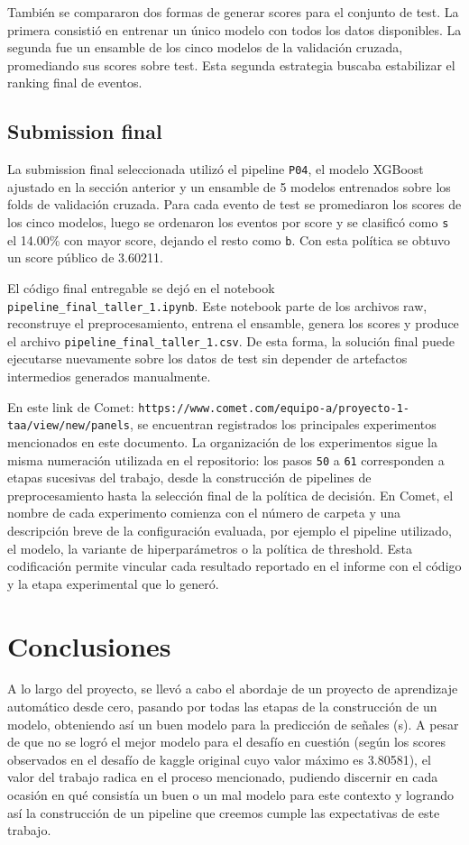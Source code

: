 \documentclass{article}
\begin{document}
También se compararon dos formas de generar scores para el conjunto de test. La primera consistió en entrenar un único modelo con todos los datos disponibles. La segunda fue un ensamble de los cinco modelos de la validación cruzada, promediando sus scores sobre test. Esta segunda estrategia buscaba estabilizar el ranking final de eventos.



\subsection{Submission final}
La submission final seleccionada utilizó el pipeline \texttt{P04}, el modelo XGBoost ajustado en la sección anterior y un ensamble de 5 modelos entrenados sobre los folds de validación cruzada. Para cada evento de test se promediaron los scores de los cinco modelos, luego se ordenaron los eventos por score y se clasificó como \texttt{s} el 14.00\% con mayor score, dejando el resto como \texttt{b}. Con esta política se obtuvo un score público de 3.60211. 

El código final entregable se dejó en el notebook \texttt{pipeline\_final\_taller\_1.ipynb}. Este notebook parte de los archivos raw, reconstruye el preprocesamiento, entrena el ensamble, genera los scores y produce el archivo \texttt{pipeline\_final\_taller\_1.csv}. De esta forma, la solución final puede ejecutarse nuevamente sobre los datos de test sin depender de artefactos intermedios generados manualmente.

En este link de Comet: \texttt{https://www.comet.com/equipo-a/proyecto-1-taa/view/new/panels}, se encuentran registrados los principales experimentos mencionados en este documento. La organización de los experimentos sigue la misma numeración utilizada en el repositorio: los pasos \texttt{50} a \texttt{61} corresponden a etapas sucesivas del trabajo, desde la construcción de pipelines de preprocesamiento hasta la selección final de la política de decisión. En Comet, el nombre de cada experimento comienza con el número de carpeta y una descripción breve de la configuración evaluada, por ejemplo el pipeline utilizado, el modelo, la variante de hiperparámetros o la política de threshold. Esta codificación permite vincular cada resultado reportado en el informe con el código y la etapa experimental que lo generó.

\section{Conclusiones}
A lo largo del proyecto, se llevó a cabo el abordaje de un proyecto de aprendizaje automático desde cero, pasando por todas las etapas de la construcción de un modelo, obteniendo así un buen modelo para la predicción de señales (s). A pesar de que no se logró el mejor modelo para el desafío en cuestión (según los scores observados en el desafío de kaggle original cuyo valor máximo es 3.80581), el valor del trabajo radica en el proceso mencionado, pudiendo discernir en cada ocasión en qué consistía un buen o un mal modelo para este contexto y logrando así la construcción de un pipeline que creemos cumple las expectativas de este trabajo. 
\end{document}

